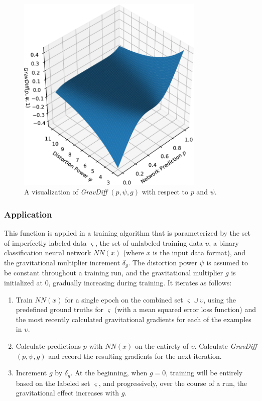 \documentclass[10pt]{article}
\begin{document}
\begin{figure}[h]
    \centering
    \includegraphics[width=0.8\textwidth]{grav_diff}
    \caption{\label{grav_diff} A visualization of {\it GravDiff} $(p, \psi, g)$ with respect to $p$ and $\psi$.}
\end{figure}

\subsubsection{Application}

This function is applied in a training algorithm that is parameterized by the set of imperfectly labeled data $\varsigma$, the set of unlabeled training data $\upsilon$, a binary classification neural network $NN(x)$ (where $x$ is the input data format), and the gravitational multiplier increment $\delta_g$. The distortion power $\psi$ is assumed to be constant throughout a training run, and the gravitational multiplier $g$ is initialized at 0, gradually increasing during training. It iterates as follows:

\begin{enumerate}
    \item Train $NN(x)$ for a single epoch on the combined set $\varsigma \cup \upsilon$, using the predefined ground truths for $\varsigma$ (with a mean squared error loss function) and the most recently calculated gravitational gradients for each of the examples in $\upsilon$.
    \item Calculate predictions $p$ with $NN(x)$ on the entirety of $\upsilon$. Calculate {\it GravDiff}$(p, \psi, g)$ and record the resulting gradients for the next iteration.
    \item Increment $g$ by $\delta_{g}$. At the beginning, when $g = 0$, training will be entirely based on the labeled set $\varsigma$, and progressively, over the course of a run, the gravitational effect increases with $g$.
\end{enumerate}
\end{document}
